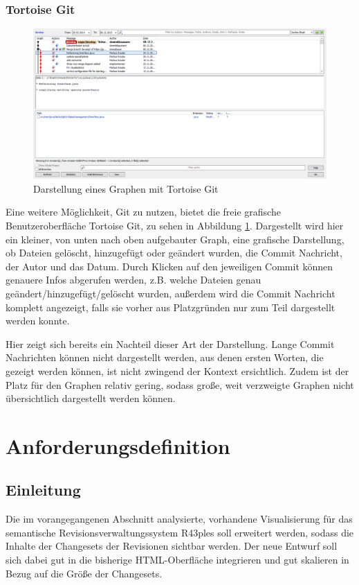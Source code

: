 \documentclass[nocolor]{tudbook}
\begin{document}
\subsection{Tortoise Git}
\begin{figure}[htb]
	\centering
	\includegraphics[width=\textwidth]{TortoiseGit.png}
	\caption{Darstellung eines Graphen mit Tortoise Git}
	\label{fig:TortoiseGit}
\end{figure}
Eine weitere Möglichkeit, Git zu nutzen, bietet die freie grafische Benutzeroberfläche Tortoise Git, zu sehen in Abbildung \ref{fig:TortoiseGit}. Dargestellt wird hier ein kleiner, von unten nach oben aufgebauter Graph, eine grafische Darstellung, ob Dateien gelöscht, hinzugefügt oder geändert wurden, die Commit Nachricht, der Autor und das Datum. Durch Klicken auf den jeweiligen Commit können genauere Infos abgerufen werden, z.B. welche Dateien genau geändert/hinzugefügt/gelöscht wurden, außerdem wird die Commit Nachricht komplett angezeigt, falls sie vorher aus Platzgründen nur zum Teil dargestellt werden konnte.

Hier zeigt sich bereits ein Nachteil dieser Art der Darstellung. Lange Commit Nachrichten können nicht dargestellt werden, aus denen ersten Worten, die gezeigt werden können, ist nicht zwingend der Kontext ersichtlich. Zudem ist der Platz für den Graphen relativ gering, sodass große, weit verzweigte Graphen nicht übersichtlich dargestellt werden können.

\chapter{Anforderungsdefinition}
\section{Einleitung}
Die im vorangegangenen Abschnitt analysierte, vorhandene Visualisierung für das semantische Revisionsverwaltungssystem R43ples soll erweitert werden, sodass die Inhalte der Changesets der Revisionen sichtbar werden. Der neue Entwurf soll sich dabei gut in die bisherige HTML-Oberfläche integrieren und gut skalieren in Bezug auf die Größe der Changesets.
\end{document}
